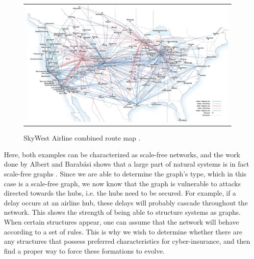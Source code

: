 \begin{figure}[h]
\centering
\begin{tabular}{@{}c@{}}
\includegraphics[width=1.0\textwidth]{../Figures/airlineRoutesUSA.png}
\end{tabular}
\caption[Caption for LOF]{SkyWest Airline combined route map \cite{airlineRoutes}.
\label{fig:airlineRouteMap}}
\end{figure}

Here, both examples can be characterized as scale-free networks, and the work done by Albert and Barabási shows that a large part of natural systems is in fact scale-free graphs \cite{audestad}. Since we are able to determine the graph's type, which in this case is a scale-free graph, we now know that the graph is vulnerable to attacks directed towards the hubs, i.e. the hubs need to be secured. For example, if a delay occurs at an airline hub, these delays will probably cascade throughout the network.
This shows the strength of being able to structure systems as graphs. When certain structures appear, one can assume that the network will behave according to a set of rules. This is why we wish to determine whether there are any structures that possess preferred characteristics for cyber-insurance, and then find a proper way to force these formations to evolve.










